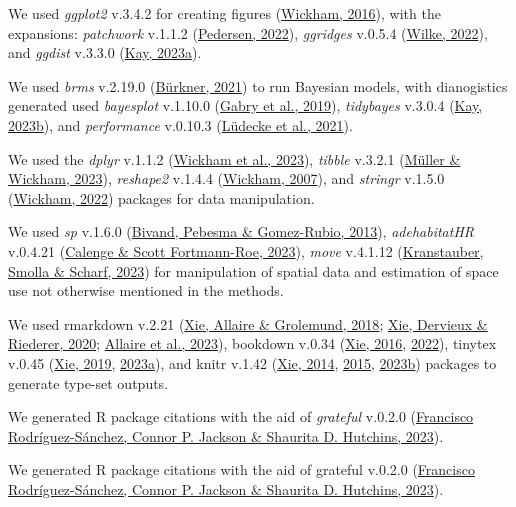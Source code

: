 \documentclass[10pt,a4paper]{article}
\begin{document}
We used \emph{ggplot2} v.3.4.2 for creating figures (\protect\hyperlink{ref-ggplot2}{Wickham, 2016}), with the expansions: \emph{patchwork} v.1.1.2 (\protect\hyperlink{ref-patchwork}{Pedersen, 2022}), \emph{ggridges} v.0.5.4 (\protect\hyperlink{ref-ggridges}{Wilke, 2022}), and \emph{ggdist} v.3.3.0 (\protect\hyperlink{ref-ggdist}{Kay, 2023a}).

We used \emph{brms} v.2.19.0 (\protect\hyperlink{ref-brms}{Bürkner, 2021}) to run Bayesian models, with dianogistics generated used \emph{bayesplot} v.1.10.0 (\protect\hyperlink{ref-bayesplot}{Gabry et al., 2019}), \emph{tidybayes} v.3.0.4 (\protect\hyperlink{ref-tidybayes}{Kay, 2023b}), and \emph{performance} v.0.10.3 (\protect\hyperlink{ref-performance}{Lüdecke et al., 2021}).

We used the \emph{dplyr} v.1.1.2 (\protect\hyperlink{ref-dplyr}{Wickham et al., 2023}), \emph{tibble} v.3.2.1 (\protect\hyperlink{ref-tibble}{Müller \& Wickham, 2023}), \emph{reshape2} v.1.4.4 (\protect\hyperlink{ref-reshape2}{Wickham, 2007}), and \emph{stringr} v.1.5.0 (\protect\hyperlink{ref-stringr}{Wickham, 2022}) packages for data manipulation.

We used \emph{sp} v.1.6.0 (\protect\hyperlink{ref-sp}{Bivand, Pebesma \& Gomez-Rubio, 2013}), \emph{adehabitatHR} v.0.4.21 (\protect\hyperlink{ref-adehabitatHR}{Calenge \& Scott Fortmann-Roe, 2023}), \emph{move} v.4.1.12 (\protect\hyperlink{ref-move}{Kranstauber, Smolla \& Scharf, 2023}) for manipulation of spatial data and estimation of space use not otherwise mentioned in the methods.

We used rmarkdown v.2.21 (\protect\hyperlink{ref-rmarkdown2018}{Xie, Allaire \& Grolemund, 2018}; \protect\hyperlink{ref-rmarkdown2020}{Xie, Dervieux \& Riederer, 2020}; \protect\hyperlink{ref-rmarkdown2023}{Allaire et al., 2023}), bookdown v.0.34 (\protect\hyperlink{ref-bookdown2016}{Xie, 2016}, \protect\hyperlink{ref-R-bookdown}{2022}), tinytex v.0.45 (\protect\hyperlink{ref-tinytex2019}{Xie, 2019}, \protect\hyperlink{ref-tinytex2023}{2023a}), and knitr v.1.42 (\protect\hyperlink{ref-knitr2014}{Xie, 2014}, \protect\hyperlink{ref-knitr2015}{2015}, \protect\hyperlink{ref-knitr2023}{2023b}) packages to generate type-set outputs.

We generated R package citations with the aid of \emph{grateful} v.0.2.0 (\protect\hyperlink{ref-grateful}{Francisco Rodríguez-Sánchez, Connor P. Jackson \& Shaurita D. Hutchins, 2023}).

We generated R package citations with the aid of grateful v.0.2.0 (\protect\hyperlink{ref-grateful}{Francisco Rodríguez-Sánchez, Connor P. Jackson \& Shaurita D. Hutchins, 2023}).
\end{document}
